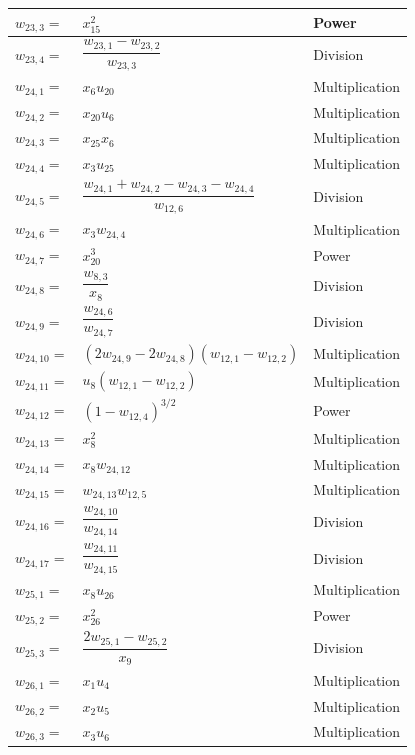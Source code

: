 \begin{longtable}{|p{1.5cm}|l|p{2cm}|}
$w_{23,3}=$ & $ x_{15}^{2} $ & Power  \\ \hline
$w_{23,4}=$ & $ \dfrac{w_{23,1}-w_{23,2}}{w_{23,3}} $ & Division \\ \hline
$w_{24,1}=$ & $ x_{6}u_{20} $ & Multiplication \\ \hline
$w_{24,2}=$ & $ x_{20}u_{6} $ & Multiplication \\ \hline
$w_{24,3}=$ & $ x_{25}x_{6} $ & Multiplication \\ \hline
$w_{24,4}=$ & $ x_{3}u_{25} $ & Multiplication \\ \hline
$w_{24,5}=$ & $ \dfrac{w_{24,1}+w_{24,2}-w_{24,3}-w_{24,4}}{w_{12,6}} $ & Division \\ \hline
$w_{24,6}=$ & $ x_{3}w_{24,4} $ & Multiplication \\ \hline
$w_{24,7}=$ & $ x_{20}^{3} $ & Power \\ \hline
$w_{24,8}=$ & $ \dfrac{w_{8,3}}{x_{8}} $ & Division \\ \hline
$w_{24,9}=$ & $ \dfrac{w_{24,6}}{w_{24,7}} $ & Division \\ \hline
$w_{24,10}=$ & $ \left(2w_{24,9}-2w_{24,8}\right)\left(w_{12,1}-w_{12,2}\right) $ & Multiplication \\ \hline
$w_{24,11}=$ & $ u_{8}\left(w_{12,1}-w_{12,2}\right) $ & Multiplication \\ \hline
$w_{24,12}=$ & $ \left(1-w_{12,4}\right)^{3/2} $ & Power \\ \hline
$w_{24,13}=$ & $ x_{8}^{2} $ & Multiplication \\ \hline
$w_{24,14}=$ & $ x_{8}w_{24,12} $ & Multiplication \\ \hline
$w_{24,15}=$ & $ w_{24,13}w_{12,5} $ & Multiplication \\ \hline
$w_{24,16}=$ & $ \dfrac{w_{24,10}}{w_{24,14}} $ & Division \\ \hline
$w_{24,17}=$ & $ \dfrac{w_{24,11}}{w_{24,15}} $ & Division \\ \hline
$w_{25,1}=$ & $ x_{8}u_{26} $ & Multiplication \\ \hline
$w_{25,2}=$ & $ x_{26}^{2} $ & Power \\ \hline
$w_{25,3}=$ & $ \dfrac{2w_{25,1}-w_{25,2}}{x_{9}} $ & Division  \\ \hline
$w_{26,1}=$ & $ x_{1}u_{4} $ & Multiplication \\ \hline
$w_{26,2}=$ & $ x_{2}u_{5} $ & Multiplication \\ \hline
$w_{26,3}=$ & $ x_{3}u_{6} $ & Multiplication \\ \hline

\end{longtable}
